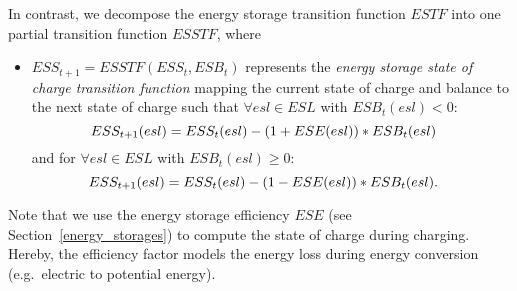 In contrast, we decompose the energy storage transition function $ESTF$ into one partial transition function $ESSTF$, where
\begin{itemize}
	\item $ESS_{t+1} = ESSTF(ESS_t, ESB_t)$ represents the \textit{energy storage state of charge transition function} mapping the current state of charge and balance to the next state of charge such that $\forall esl \in ESL$ with $ESB_t(esl) < 0:$
	\begin{equation*}
	\hspace*{-0.4cm} ESS_{t+1}(esl) = ESS_t(esl) - (1+ESE(esl)) * ESB_t(esl)
	\end{equation*}
	and for $\forall esl \in ESL$ with $ESB_t(esl) \geq 0:$
	\begin{equation*}
	\hspace*{-0.4cm} ESS_{t+1}(esl) = ESS_t(esl) - (1-ESE(esl)) * ESB_t(esl) \mathrm{.}
	\end{equation*}
\end{itemize}
	
Note that we use the energy storage efficiency $ESE$ (see Section~\ref{energy_storages}) to compute the state of charge during charging. Hereby, the efficiency factor models the energy loss during energy conversion (e.g.\ electric to potential energy). 

